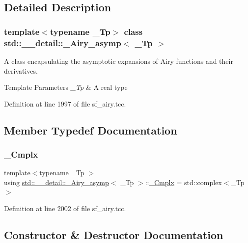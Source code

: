 \subsection{Detailed Description}
\subsubsection*{template$<$typename \+\_\+\+Tp$>$\newline
class std\+::\+\_\+\+\_\+detail\+::\+\_\+\+Airy\+\_\+asymp$<$ \+\_\+\+Tp $>$}

A class encapsulating the asymptotic expansions of Airy functions and their derivatives.


\begin{DoxyTemplParams}{Template Parameters}
{\em \+\_\+\+Tp} & A real type \\
\hline
\end{DoxyTemplParams}


Definition at line 1997 of file sf\+\_\+airy.\+tcc.



\subsection{Member Typedef Documentation}
\mbox{\label{classstd_1_1____detail_1_1__Airy__asymp_ae28f102423d34e78502ab6da42d67f50}} 
\subsubsection{\texorpdfstring{\+\_\+\+Cmplx}{\_Cmplx}}
{\footnotesize\ttfamily template$<$typename \+\_\+\+Tp $>$ \\
using \hyperlink{classstd_1_1____detail_1_1__Airy__asymp}{std\+::\+\_\+\+\_\+detail\+::\+\_\+\+Airy\+\_\+asymp}$<$ \+\_\+\+Tp $>$\+::\hyperlink{classstd_1_1____detail_1_1__Airy__asymp_ae28f102423d34e78502ab6da42d67f50}{\+\_\+\+Cmplx} =  std\+::complex$<$\+\_\+\+Tp$>$}



Definition at line 2002 of file sf\+\_\+airy.\+tcc.



\subsection{Constructor \& Destructor Documentation}
\mbox{\label{classstd_1_1____detail_1_1__Airy__asymp_a93f2010a2c48be2f38445420ba019a52}} 
